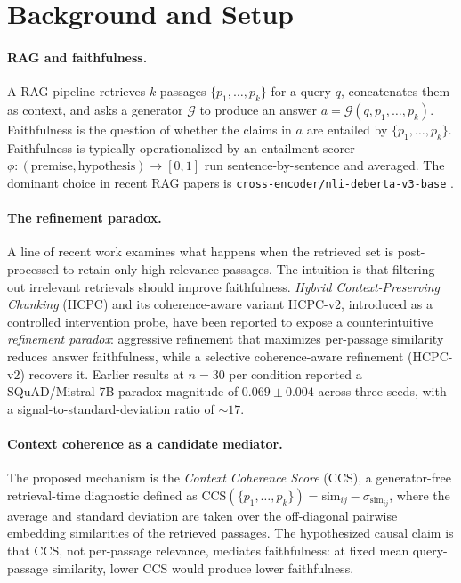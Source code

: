 \section{Background and Setup}
\label{sec:background}

\paragraph{RAG and faithfulness.}
A RAG pipeline retrieves $k$ passages
$\{p_1, \ldots, p_k\}$ for a query $q$, concatenates them as
context, and asks a generator $\mathcal{G}$ to produce an answer
$a = \mathcal{G}(q, p_1, \ldots, p_k)$. Faithfulness is the question
of whether the claims in $a$ are entailed by
$\{p_1, \ldots, p_k\}$. Faithfulness is typically operationalized
by an entailment scorer $\phi: (\text{premise},
\text{hypothesis}) \to [0, 1]$ run sentence-by-sentence and
averaged. The dominant choice in recent RAG papers is
\texttt{cross-encoder/nli-deberta-v3-base}
\citep{he2021debertav3}.

\paragraph{The refinement paradox.}
A line of recent work \citep{xu2023recomp} examines what happens
when the retrieved set is post-processed to retain only
high-relevance passages. The intuition is that filtering out
irrelevant retrievals should improve faithfulness. \emph{Hybrid
Context-Preserving Chunking} (HCPC) and its
coherence-aware variant HCPC-v2, introduced as a controlled
intervention probe, have been reported to expose a counterintuitive
\emph{refinement paradox}: aggressive refinement that maximizes
per-passage similarity reduces answer faithfulness, while a
selective coherence-aware refinement (HCPC-v2) recovers it. Earlier
results at $n{=}30$ per condition reported a SQuAD/Mistral-7B
paradox magnitude of $0.069 \pm 0.004$ across three seeds, with a
signal-to-standard-deviation ratio of $\sim 17$.

\paragraph{Context coherence as a candidate mediator.}
The proposed mechanism is the \emph{Context Coherence Score} (CCS),
a generator-free retrieval-time diagnostic defined as
\(\mathrm{CCS}(\{p_1, \ldots, p_k\}) = \overline{\mathrm{sim}}_{ij}
- \sigma_{\mathrm{sim}_{ij}}\), where the average and standard
deviation are taken over the off-diagonal pairwise embedding
similarities of the retrieved passages.
The hypothesized causal claim is that CCS, not per-passage
relevance, mediates faithfulness: at fixed mean query-passage
similarity, lower CCS would produce lower faithfulness.


